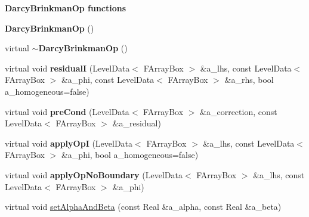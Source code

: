 \begin{Indent}{\bf Darcy\-Brinkman\-Op functions}\par
\begin{DoxyCompactItemize}
\item 
\hypertarget{class_darcy_brinkman_op_a6cd24f28d1df8726929ae287490b9a3c}{{\bfseries Darcy\-Brinkman\-Op} ()}\label{class_darcy_brinkman_op_a6cd24f28d1df8726929ae287490b9a3c}

\item 
\hypertarget{class_darcy_brinkman_op_a944fdaaac1b4d62baad0d5ecd148891f}{virtual {\bfseries $\sim$\-Darcy\-Brinkman\-Op} ()}\label{class_darcy_brinkman_op_a944fdaaac1b4d62baad0d5ecd148891f}

\item 
\hypertarget{class_darcy_brinkman_op_a9bacaab9278b52f297ba8ef6fdd438a4}{virtual void {\bfseries residual\-I} (Level\-Data$<$ F\-Array\-Box $>$ \&a\-\_\-lhs, const Level\-Data$<$ F\-Array\-Box $>$ \&a\-\_\-phi, const Level\-Data$<$ F\-Array\-Box $>$ \&a\-\_\-rhs, bool a\-\_\-homogeneous=false)}\label{class_darcy_brinkman_op_a9bacaab9278b52f297ba8ef6fdd438a4}

\item 
\hypertarget{class_darcy_brinkman_op_af6eb3662000de656241b272ca947ff53}{virtual void {\bfseries pre\-Cond} (Level\-Data$<$ F\-Array\-Box $>$ \&a\-\_\-correction, const Level\-Data$<$ F\-Array\-Box $>$ \&a\-\_\-residual)}\label{class_darcy_brinkman_op_af6eb3662000de656241b272ca947ff53}

\item 
\hypertarget{class_darcy_brinkman_op_ab844b37881daf983c00080b9cb4da099}{virtual void {\bfseries apply\-Op\-I} (Level\-Data$<$ F\-Array\-Box $>$ \&a\-\_\-lhs, const Level\-Data$<$ F\-Array\-Box $>$ \&a\-\_\-phi, bool a\-\_\-homogeneous=false)}\label{class_darcy_brinkman_op_ab844b37881daf983c00080b9cb4da099}

\item 
\hypertarget{class_darcy_brinkman_op_aa7c0a826f1109c621a7ce43efb915c5e}{virtual void {\bfseries apply\-Op\-No\-Boundary} (Level\-Data$<$ F\-Array\-Box $>$ \&a\-\_\-lhs, const Level\-Data$<$ F\-Array\-Box $>$ \&a\-\_\-phi)}\label{class_darcy_brinkman_op_aa7c0a826f1109c621a7ce43efb915c5e}

\item 
\hypertarget{class_darcy_brinkman_op_ac2879982d9153c9e83b1e86c2a19caa7}{virtual void \hyperlink{class_darcy_brinkman_op_ac2879982d9153c9e83b1e86c2a19caa7}{set\-Alpha\-And\-Beta} (const Real \&a\-\_\-alpha, const Real \&a\-\_\-beta)}\label{class_darcy_brinkman_op_ac2879982d9153c9e83b1e86c2a19caa7}


\end{DoxyCompactItemize}
\end{Indent}

